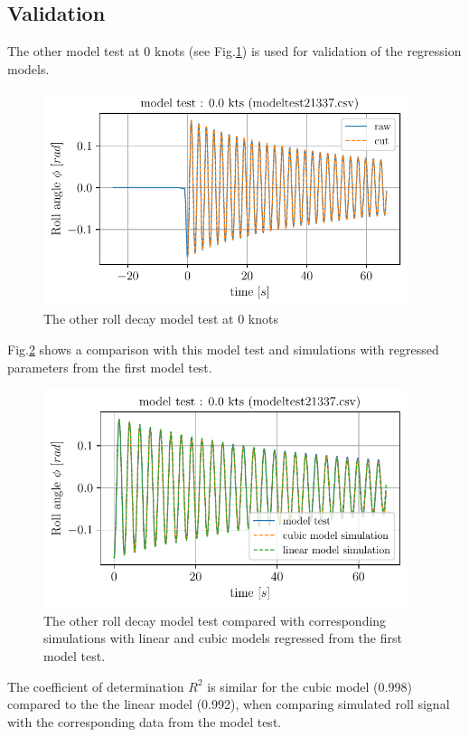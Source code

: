 \subsection*{Validation}\label{validation}
The other model test at 0 knots (see
Fig.\ref{fig:other_roll_decay}) is used for validation of the
regression models.
\begin{figure}[H]
\begin{center}\includegraphics[width = 0.95\textwidth]{figures/other_roll_decay.pdf}\end{center}
\vspace{-0.7cm}
\caption{The other roll decay model test at 0 knots}
\label{fig:other_roll_decay}
\end{figure}
Fig.\ref{fig:other_roll_decay_sim} shows a comparison with this
model test and simulations with regressed parameters from the first
model test.
\begin{figure}[H]
\begin{center}\includegraphics[width = 0.95\textwidth]{figures/other_roll_decay_sim.pdf}\end{center}
\vspace{-0.7cm}
\caption{The other roll decay model test compared with corresponding simulations with linear and cubic models regressed from the first model test.}
\label{fig:other_roll_decay_sim}
\end{figure}
The coefficient of determination $R^2$ is similar for the cubic model
(0.998) compared to the the linear model (0.992), when comparing
simulated roll signal with the corresponding data from the model test.
